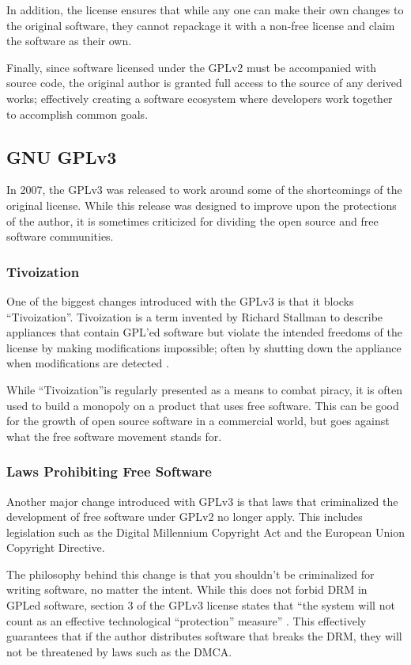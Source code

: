 \documentclass[12pt,letterpaper]{article}
\begin{document}
In addition, the license ensures that while any one can make their own changes to the original software, they cannot repackage it with a non-free license and claim the software as their own.

Finally, since software licensed under the GPLv2 must be accompanied with source code, the original author is granted full access to the source of any derived works; effectively creating a software ecosystem where developers work together to accomplish common goals.

\subsection{GNU GPLv3}

In 2007, the GPLv3 was released to work around some of the shortcomings of the original license. While this release was designed to improve upon the protections of the author, it is sometimes criticized for dividing the open source and free software communities.

\subsubsection{Tivoization}
One of the biggest changes introduced with the GPLv3 is that it blocks ``Tivoization''. Tivoization is a term invented by Richard Stallman to describe appliances that contain GPL'ed software but violate the intended freedoms of the license by making modifications impossible; often by shutting down the appliance when modifications are detected \cite{gpl3}.

While ``Tivoization''is regularly presented as a means to combat piracy, it is often used to build a monopoly on a product that uses free software. This can be good for the growth of open source software in a commercial world, but goes against what the free software movement stands for.

\subsubsection{Laws Prohibiting Free Software}

Another major change introduced with GPLv3 is that laws that criminalized the development of free software under GPLv2 no longer apply. This includes legislation such as the Digital Millennium Copyright Act and the European Union Copyright Directive.

The philosophy behind this change is that you shouldn't be criminalized for writing software, no matter the intent. While this does not forbid DRM in GPLed software, section 3 of the GPLv3 license states that ``the system will not count as an effective technological ``protection'' measure'' \cite{gpl3}. This effectively guarantees that if the author distributes software that breaks the DRM, they will not be threatened by laws such as the DMCA.
\end{document}
